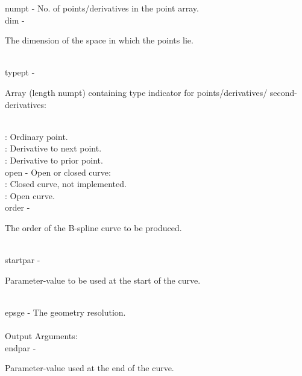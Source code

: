         \>\>    {\fov numpt}    \> - \>
                                No. of points/derivatives in the
                                point array.
                                \\
        \>\>    {\fov dim}      \> - \> \begin{minipg2}
                                The dimension of the space in which
                                the points lie.
                                \end{minipg2}\\
        \>\>    {\fov typept}   \> - \> \begin{minipg2}
                                Array (length numpt) containing type
                                indicator for points/derivatives/
                                second-derivatives:
                                \end{minipg2} \\[0.3ex]
                \>\>\>\> : Ordinary point.\\
                \>\>\>\> : Derivative to next point.\\
                \>\>\>\> : Derivative to prior point.\\
        \>\>    {\fov open}     \> - \> Open or closed curve:\\
                \>\>\>\> :     Closed curve, not implemented.\\
                \>\>\>\> :     Open curve.\\
        \>\>    {\fov order}    \> - \> \begin{minipg2}
                                The order of the B-spline curve
                                to be produced.
                                \end{minipg2}\\
        \>\>    {\fov startpar}\> - \>  \begin{minipg2}
                                Parameter-value to be used at the
                                start of the curve.
                                \end{minipg2}\\
        \>\>    {\fov epsge}    \> - \> The geometry resolution.\\
\\
\newpagetabs
        \>Output Arguments:\\
        \>\>    {\fov endpar}   \> - \> \begin{minipg2}
                                Parameter-value used at the end
                                of the curve.
                                \end{minipg2}\\
